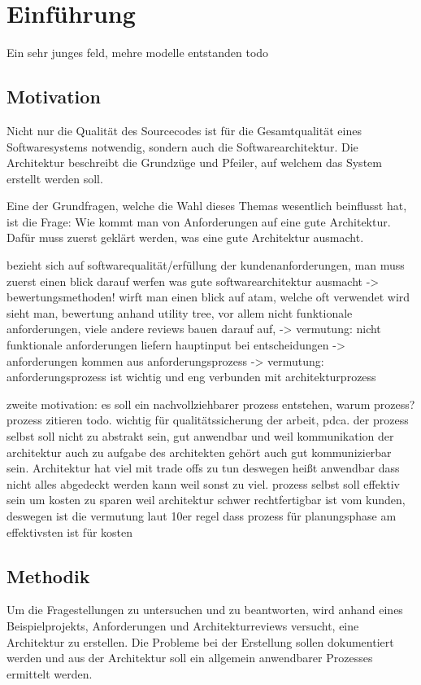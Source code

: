 \chapter{Einführung}
Ein sehr junges feld, mehre modelle entstanden todo

\section{Motivation}
Nicht nur die Qualität des Sourcecodes ist für die Gesamtqualität eines Softwaresystems notwendig, sondern auch die Softwarearchitektur. Die Architektur beschreibt die Grundzüge und Pfeiler, auf welchem das System erstellt werden soll.

Eine der Grundfragen, welche die Wahl dieses Themas wesentlich beinflusst hat, ist die Frage: Wie kommt man von Anforderungen auf eine gute Architektur. Dafür muss zuerst geklärt werden, was eine gute Architektur ausmacht.

bezieht sich auf softwarequalität/erfüllung der kundenanforderungen, man muss zuerst einen blick darauf werfen was gute softwarearchitektur ausmacht -> bewertungsmethoden! wirft man einen blick auf atam, welche oft verwendet wird sieht man, bewertung anhand utility tree, vor allem nicht funktionale anforderungen, viele andere reviews bauen darauf auf, -> vermutung: nicht funktionale anforderungen liefern hauptinput bei entscheidungen -> anforderungen kommen aus anforderungsprozess -> vermutung: anforderungsprozess ist wichtig und eng verbunden mit architekturprozess

zweite motivation: es soll ein nachvollziehbarer prozess entstehen, warum prozess? prozess zitieren todo. wichtig für qualitätssicherung der arbeit, pdca. der prozess selbst soll nicht zu abstrakt sein, gut anwendbar und weil kommunikation der architektur auch zu aufgabe des architekten gehört auch gut kommunizierbar sein. Architektur hat viel mit trade offs zu tun deswegen heißt anwendbar dass nicht alles abgedeckt werden kann weil sonst zu viel. prozess selbst soll effektiv sein um kosten zu sparen weil architektur schwer rechtfertigbar ist vom kunden, deswegen ist die vermutung laut 10er regel dass prozess für planungsphase am effektivsten ist für kosten

\section{Methodik}
Um die Fragestellungen zu untersuchen und  zu beantworten, wird anhand eines  Beispielprojekts, Anforderungen und Architekturreviews versucht, eine Architektur zu erstellen. Die Probleme bei der Erstellung sollen dokumentiert werden und aus der Architektur soll ein allgemein anwendbarer Prozesses ermittelt werden.

